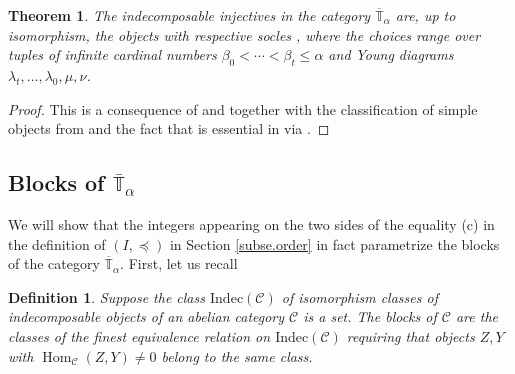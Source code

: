 \documentclass[11pt]{article}
\theoremstyle{plain}
\newtheorem{theorem}[lemma]{Theorem}
\theoremstyle{nonumberplain}
\theoremstyle{plain}
\newtheorem{definition}[lemma]{Definition}
\theoremstyle{nonumberplain}
\newtheorem{proof}{Proof}
\newcommand\bT{\mathbb T}
\newcommand\cC{\mathcal C}
\DeclareMathOperator{\Hom}{\mathrm{Hom}}
\begin{document}
\begin{theorem}\label{th.indec_inj-gen}
  The indecomposable injectives in the category
  $\overline{\bT}_\alpha$ are, up to isomorphism, the objects
   with respective socles , where
  the choices range over tuples of infinite cardinal numbers
  $\beta_0<\cdots<\beta_t\le \alpha$ and Young diagrams
  $\lambda_t,\ldots,\lambda_0,\mu,\nu$.
\end{theorem}
\begin{proof}
  This is a consequence of  and  together
  with the classification of simple objects from  and
  the fact that  is essential in 
  via .
\end{proof}


\subsection{Blocks of $\bar{\bT}_\alpha$}
\label{sec.blocksbT}


We will show that the integers appearing on the two sides of
the equality (c) in the definition of $(I,{\preceq})$ in Section \ref{subse.order} in fact
parametrize the blocks of the category $\overline{\bT}_\alpha$.  First, let us recall


\begin{definition}\label{def.blocks}
  Suppose the class $\mathrm{Indec}(\cC)$ of isomorphism classes of indecomposable objects of
  an abelian category $\cC$ is a set. The {\it blocks} of $\cC$ are
  the classes of the finest equivalence relation on
  $\mathrm{Indec}(\cC)$ requiring that objects $Z,Y$ with
  $\Hom_\cC(Z,Y)\ne 0$ belong to the same class.
\end{definition}
\end{document}
